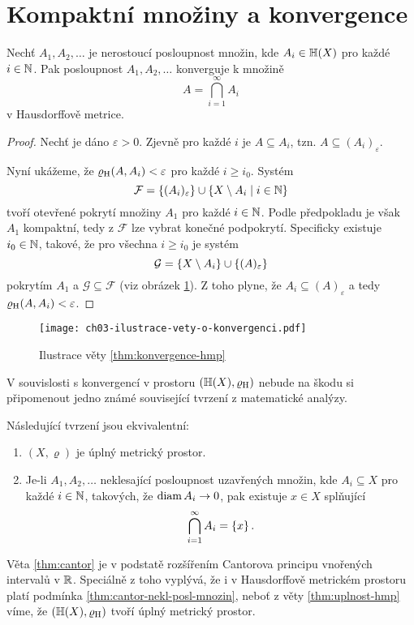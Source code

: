 \section{Kompaktní množiny a konvergence}\label{sec:konvergence-hmp}

\begin{theorem}\label{thm:konvergence-hmp}
    Nechť $A_1,A_2,\ldots$ je nerostoucí posloupnost množin, kde $A_i\in\mathbb{H}(X)$ pro každé $i\in\mathbb{N}$. Pak posloupnost $A_1,A_2,\ldots$ konverguje k množině
    \[A=\bigcap_{i=1}^\infty A_i\]
    v Hausdorffově metrice.
\end{theorem}
\begin{proof}
    Nechť je dáno $\varepsilon>0$. Zjevně pro každé $i$ je $A\subseteq A_i$, tzn. $A\subseteq(A_i)_\varepsilon$.
    
    Nyní ukážeme, že $\varrho_\textup{H}(A,A_i)<\varepsilon$ pro každé $i\geqslant i_0$. Systém
    \[\mathcal{F}=\left\{(A_i)_\varepsilon\right\}\cup\left\{X\setminus A_i\mid i\in\mathbb{N}\right\}\]
    tvoří otevřené pokrytí množiny $A_1$ pro každé $i\in\mathbb{N}$. Podle předpokladu je však $A_1$ kompaktní, tedy z $\mathcal{F}$ lze vybrat konečné podpokrytí. Specificky existuje $i_0\in\mathbb{N}$, takové, že pro všechna $i\geqslant i_0$ je systém
    \[\mathcal{G}=\left\{X\setminus A_i\right\}\cup\left\{(A)_\varepsilon\right\}\]
    pokrytím $A_1$ a $\mathcal{G}\subseteq\mathcal{F}$ (viz obrázek \ref{fig:konvergence-hmp}). Z toho plyne, že $A_i\subseteq (A)_\varepsilon$ a tedy $\varrho_\textup{H}(A,A_i)<\varepsilon$.
\end{proof}
\begin{figure}[h]
    \centering
    \texttt{[image: ch03-ilustrace-vety-o-konvergenci.pdf]}
    \caption{Ilustrace věty \ref{thm:konvergence-hmp}}
    \label{fig:konvergence-hmp}
\end{figure}

V souvislosti s konvergencí v prostoru $(\mathbb{H}(X),\varrho_\textup{H})$ nebude na škodu si připomenout jedno známé související tvrzení z matematické analýzy.
\begin{theorem}[Cantorova]\label{thm:cantor}
    Následující tvrzení jsou ekvivalentní:
    \begin{enumerate}[label=(\roman*)]
        \item\label{thm:cantor-uplnost} $(X,\varrho)$ je úplný metrický prostor.
        \item\label{thm:cantor-nekl-posl-mnozin} Je-li $A_1,A_2,\ldots$ neklesající posloupnost uzavřených množin, kde $A_i\subseteq X$ pro každé $i\in\mathbb{N}$, takových, že $\operatorname{diam}{A_i}\to 0$, pak existuje $x\in X$ splňující
        \[\bigcap_{i=1}^\infty A_i=\left\{x\right\}.\]
    \end{enumerate}
\end{theorem}
Věta \ref{thm:cantor} je v podstatě rozšířením Cantorova principu vnořených intervalů v $\mathbb{R}$. Speciálně z toho vyplývá, že i v Hausdorffově metrickém prostoru platí podmínka \ref{thm:cantor-nekl-posl-mnozin}, neboť z věty \ref{thm:uplnost-hmp} víme, že $(\mathbb{H}(X),\varrho_\textup{H})$ tvoří úplný metrický prostor.